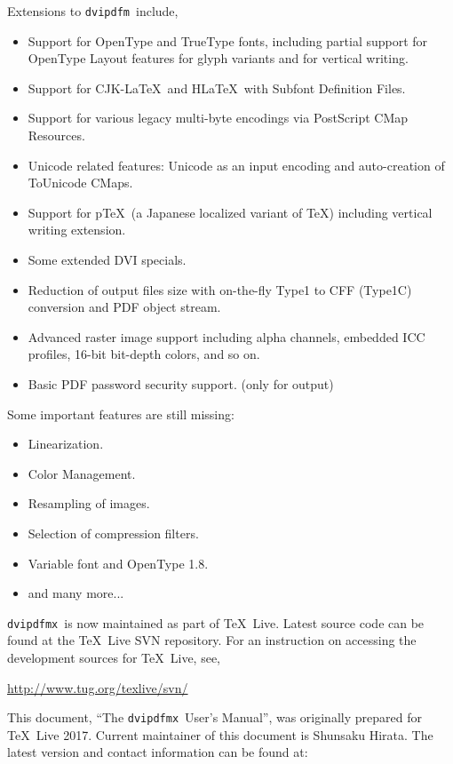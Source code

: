 \documentclass[a4paper,xetex,oneside]{book}
\newcommand{\dvipdfm}{\texttt{dvipdfm}}
\newcommand{\dvipdfmx}{\texttt{dvipdfmx}}
\begin{document}
Extensions to \dvipdfm\ include,
\begin{itemize}
    \item Support for OpenType and TrueType fonts, including partial support
    for OpenType Layout features for glyph variants and for vertical writing.
    \item Support for CJK-\LaTeX\ and H\LaTeX\ with Subfont Definition Files.
    \item Support for various legacy multi-byte encodings via PostScript CMap
     Resources.
    \item Unicode related features: Unicode as an input encoding and
    auto-creation of ToUnicode CMaps.
    \item Support for p\TeX\ (a Japanese localized variant of \TeX) including
    vertical writing extension.
    \item Some extended DVI specials.
    \item Reduction of output files size with on-the-fly Type1 to CFF (Type1C)
    conversion and PDF object stream.
    \item Advanced raster image support including alpha channels, embedded
    ICC profiles, 16-bit bit-depth colors, and so on.
    \item Basic PDF password security support. (only for output)
\end{itemize}
Some important features are still missing:
\begin{itemize}
    \item Linearization.
    \item Color Management.
    \item Resampling of images.
    \item Selection of compression filters.
    \item Variable font and OpenType 1.8.
    \item and many more...
\end{itemize}

\dvipdfmx\ is now maintained as part of \TeX\ Live. Latest source code can
be found at the \TeX\ Live SVN repository. For an instruction on accessing the
development sources for \TeX\ Live, see,\medskip

\url{http://www.tug.org/texlive/svn/}
\medskip

This document, ``The \dvipdfmx\ User's Manual'', was originally prepared for
\TeX\ Live 2017. Current maintainer of this document is Shunsaku Hirata.
The latest version and contact information can be found at:\medskip
\end{document}
